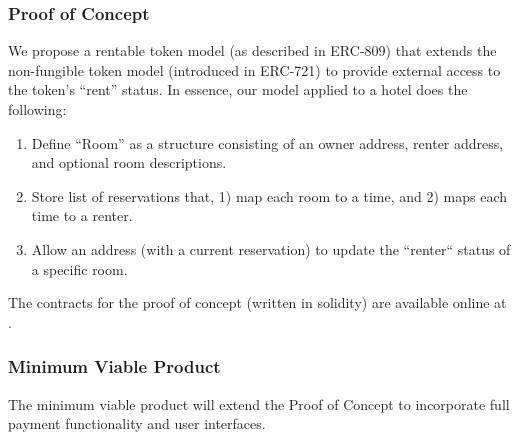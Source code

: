 \documentclass{article}
\begin{document}
\subsubsection*{Proof of Concept}

\begin{flushleft}
We propose a rentable token model (as described in ERC-809) that extends the non-fungible token model (introduced in ERC-721) to provide external access to the token's ``rent'' status. In essence, our model applied to a hotel does the following: 

\begin{enumerate}
\item Define ``Room'' as a structure consisting of an owner address, renter address, and optional room descriptions. 
\item Store list of reservations that, 1) map each room to a time, and 2) maps each time to a renter. 
\item Allow an address (with a current reservation) to update the ``renter`` status of a specific room. 
\end{enumerate} 

The contracts for the proof of concept (written in solidity) are available online at .

\end{flushleft}

\subsubsection*{Minimum Viable Product}
The minimum viable product will extend the Proof of Concept to incorporate full payment functionality and user interfaces. 
\end{document}
